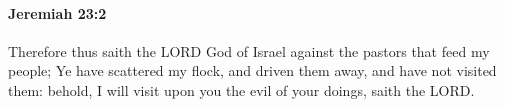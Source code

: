 
		\paragraph{Jeremiah 23:2} %
			\label{JEREMIAH-23-2}

			Therefore thus saith the LORD God of Israel against the pastors that feed my people; Ye have scattered my flock, and driven them away, and have not visited them: behold, I will visit upon you the evil of your doings, saith the LORD.


